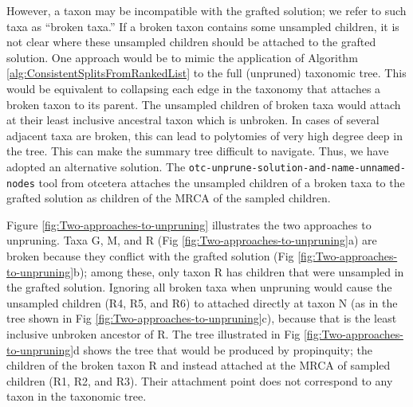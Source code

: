 \documentclass[fleqn,12pt,lineno,english]{wlpeerj}
\begin{document}
However, a taxon may be incompatible with the grafted solution; we
refer to such taxa as ``broken taxa.'' If a broken taxon contains
some unsampled children, it is not clear where these unsampled children
should be attached to the grafted solution. One approach would be
to mimic the application of Algorithm \ref{alg:ConsistentSplitsFromRankedList}
to the full (unpruned) taxonomic tree. This would be equivalent to
collapsing each edge in the taxonomy that attaches a broken taxon
to its parent. The unsampled children of broken taxa would attach
at their least inclusive ancestral taxon which is unbroken. In cases
of several adjacent taxa are broken, this can lead to polytomies of
very high degree deep in the tree. This can make the summary tree
difficult to navigate. Thus, we have adopted an alternative solution.
The \texttt{otc-unprune-solution-and-name-unnamed-nodes} tool from
otcetera attaches the unsampled children of a broken taxa to the grafted
solution as children of the MRCA of the sampled children.

Figure \ref{fig:Two-approaches-to-unpruning} illustrates the two
approaches to unpruning. Taxa G, M, and R (Fig \ref{fig:Two-approaches-to-unpruning}a)
are broken because they conflict with the grafted solution (Fig \ref{fig:Two-approaches-to-unpruning}b);
among these, only taxon R has children that were unsampled in the
grafted solution. Ignoring all broken taxa when unpruning would cause
the unsampled children (R4, R5, and R6) to attached directly at taxon
N (as in the tree shown in Fig \ref{fig:Two-approaches-to-unpruning}c),
because that is the least inclusive unbroken ancestor of R. The tree
illustrated in Fig \ref{fig:Two-approaches-to-unpruning}d shows the
tree that would be produced by propinquity; the children of the broken
taxon R and instead attached at the MRCA of sampled children (R1,
R2, and R3). Their attachment point does not correspond to any taxon
in the taxonomic tree.
\end{document}
